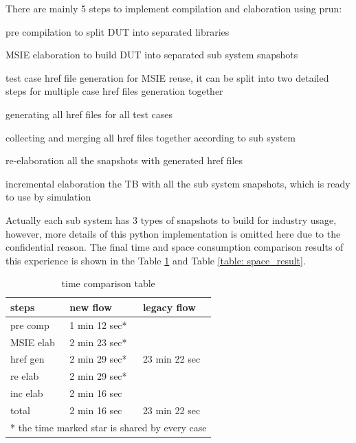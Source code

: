 \documentclass[twoside]{article}
\begin{document}
\begin{multicols}{2}
  There are mainly 5 steps to implement compilation and elaboration using prun:
  \begin{compactitem}
  \item pre compilation to split DUT into separated libraries
  \item MSIE elaboration to build DUT into separated sub system snapshots
  \item test case href file generation for MSIE reuse, it can be split into two detailed steps for multiple case href files generation together
    \begin{compactitem}
    \item generating all href files for all test cases
    \item collecting and merging all href files together according to sub system
    \end{compactitem}
  \item re-elaboration all the snapshots with generated href files
  \item incremental elaboration the TB with all the sub system snapshots, which is ready to use by simulation
  \end{compactitem}

  Actually each sub system has 3 types of snapshots to build for industry usage, however, more details of this python implementation is omitted here due to the confidential reason. The final time and space consumption comparison results of this experience is shown in the Table \ref{table: time_result} and Table \ref{table: space_result}.

  \begin{table}[H]
    \caption{time comparison table}
    \centering
    \begin{tabular}{lll}
      \toprule
      \textbf{steps} & \textbf{new flow} & \textbf{legacy flow} \\
      \midrule
      pre comp & 1 min 12 sec* & \multirow{5}{*}{23 min 22 sec} \\
      \cline{1-2}
      MSIE elab & 2 min 23 sec* & \\
      \cline{1-2}
      href gen & 2 min 29 sec* & \\
      \cline{1-2}
      re elab & 2 min 29 sec* & \\
      \cline{1-2}
      inc elab & 2 min 16 sec & \\
      \hline
      total & 2 min 16 sec & 23 min 22 sec \\
      \bottomrule
      \multicolumn{3}{l}{\footnotesize{* the time marked star is shared by every case}}
    \end{tabular}
    \label{table: time_result}
  \end{table}


\end{multicols}
\end{document}
